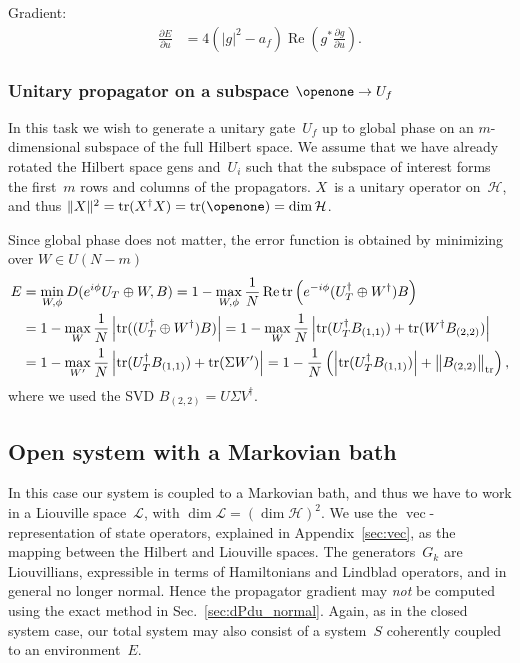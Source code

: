 \documentclass[aps, pra, a4paper, longbibliography, superscriptaddress]{revtex4-1}
\newcommand{\I}{\openone}
\newcommand{\hilb}[1]{\mathcal{#1}}
\DeclareMathOperator{\tr}{tr}
\DeclareMathOperator{\re}{Re}
\DeclareMathOperator{\cvec}{vec}
\newcommand{\dd}[2]{\frac{\partial #1}{\partial #2}}
\begin{document}
Gradient:
\begin{align}
\dd{E}{u}
&=
4 \left(\left|g\right|^2 -a_{f} \right) \re \left(g^* \dd{g}{u}\right).
\end{align}


\subsubsection{Unitary propagator on a subspace $\I \to U_f$}
\label{sec:closed-u-sub}
In this task we wish to generate a unitary gate~$U_f$ up to global
phase on an $m$-dimensional subspace of the full Hilbert space.
We assume that we have already rotated the Hilbert space gens and~$U_i$ such that
the subspace of interest forms the first~$m$ rows and columns of the propagators.
$X$~is a unitary operator on~$\hilb{H}$, and
thus $\|X\|^2 = \tr(X^\dagger X) = \tr(\I) = \dim \hilb{H}$.

Since global phase does not matter, the error function is
obtained by minimizing over $W \in U(N-m)$
\begin{align}
\notag
E
&= \min_{W, \phi} D(e^{i \phi} U_T \oplus W, B)
= 1 -\max_{W, \phi} \frac{1}{N} \re \tr \left(e^{-i \phi} (U_T^\dagger \oplus W^\dagger) B\right)\\
\notag
&= 1 -\max_{W} \frac{1}{N} \left|\tr ((U_T^\dagger \oplus W^\dagger) B)\right|
= 1 -\max_{W} \frac{1}{N} \left|\tr (U_T^\dagger B_{(1,1)}) +\tr (W^\dagger B_{(2,2)})\right|\\
&= 1 -\max_{W'} \frac{1}{N} \left|\tr (U_T^\dagger B_{(1,1)}) +\tr (\Sigma W')\right|
= 1 -\frac{1}{N} \left(\left|\tr (U_T^\dagger B_{(1,1)})\right| +\left\|B_{(2,2)}\right\|_{\tr} \right),
\end{align}
where we used the SVD $B_{(2,2)} = U \Sigma V^\dagger$.





\subsection{Open system with a Markovian bath}

In this case our system is coupled to a Markovian bath, and thus
we have to work in a Liouville space~$\hilb{L}$,
with $\dim \hilb{L} = (\dim \hilb{H})^2$.
We use the $\cvec$-representation of state
operators, explained in Appendix~\ref{sec:vec},
as the mapping between the Hilbert and Liouville spaces.
The generators~$G_k$ are Liouvillians, expressible in terms of
Hamiltonians and Lindblad operators, and in general no longer normal.
Hence the propagator gradient may \emph{not} be computed using the exact
method in Sec.~\ref{sec:dPdu_normal}.
Again, as in the closed system case, our total system may also consist of
a system~$S$ coherently coupled to an environment~$E$.
\end{document}
